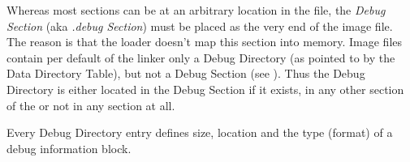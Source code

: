Whereas most sections can be at an arbitrary location in the file, the \emph{Debug Section} (aka \emph{.debug Section}) must be placed as the very end of the image file. The reason is that the loader doesn't map this section into memory. Image files contain per default of the linker only a Debug Directory (as pointed to by the Data Directory Table), but not a Debug Section (see \cite[]{pespec}). Thus the Debug Directory is either located in the Debug Section if it exists, in any other section of the \PE{} or not in any section at all.

Every Debug Directory entry defines \ia{} size, location and the type (format) of a debug information block. 



